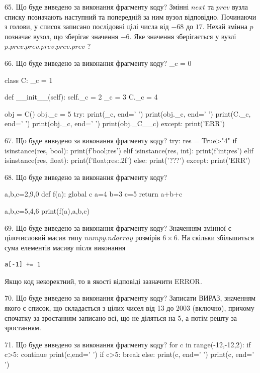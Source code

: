 \documentclass[11pt]{article}
\begin{document}
65. Що буде виведено за виконання фрагменту коду?
Змінні $next$ та $prev$ вузла списку позначають наступний та попередній за ним вузол відповідно. Починаючи з голови, у список записано послідовні цілі числа від $-68$ до $17$. Нехай змінна $p$ позначає вузол, що зберігає значення $-6$.
Яке значення зберігається у вузлі $p.prev.prev.prev.prev.prev$ ?

66. Що буде виведено за виконання фрагменту коду?
_c = 0

class C:
    _c = 1
    
    def __init__(self):
        self._c = 2
        _c = 3
        C._c = 4

obj = C()
obj._c = 5
try:
    print(_c, end=' ')
    print(obj._c, end=' ')
    print(C._c, end=' ')
    print(obj._c, end=' ')
    print(obj._C__c)
except:
    print('ERR')

67. Що буде виведено за виконання фрагменту коду?
try:
    res = True>"4"
    if isinstance(res, bool):
        print(f'bool;{res}')
    elif isinstance(res, int):
        print(f'int;{res}')
    elif isinstance(res, float):
        print(f'float;{res:.2f}')
    else:
        print('???')
except:
    print('ERR')

68. Що буде виведено за виконання фрагменту коду?

a,b,c=2,9,0
def f(a):
global c    a=4
    b=3
    c=5
    return a+b+c

a,b,c=5,4,6
print(f(a),a,b,c)

69. Що буде виведено за виконання фрагменту коду?
Значенням змінної  є цілочисловий масив типу $numpy.ndarray$ розмірів $6{\times}6$. На скільки збільшиться сума елементів масиву  після виконання
\begin{verbatim}
a[-1] += 1
\end{verbatim}


Якщо код некоректний, то в якості відповіді зазначити ERROR.



70. Що буде виведено за виконання фрагменту коду?
Записати ВИРАЗ, значенням якого є список, що складається з цілих чисел від 13 до 2003 (включно), причому спочатку за зростанням записано всі, що не діляться на 5, а потім решту за зростанням.

71. Що буде виведено за виконання фрагменту коду?
for c in range(-12,-12,2):
    if c>5:
        continue
        print(c,end=' ')
    if c>5:
        break
else:
    print(c, end=' ')
print(c, end=' ')
\end{document}

